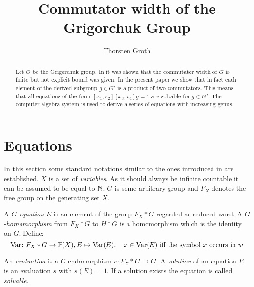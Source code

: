 \documentclass[a4paper,12pt]{article}
\title{Commutator width of the Grigorchuk Group}
\author{Thorsten Groth}
\begin{document}
\maketitle
%

\begin{abstract}
Let $G$ be the Grigorchuk group. In \cite{Lysenok:QudraticEquationsInGrig} it was shown that the commutator width of $G$ is finite but not explicit bound was given.
In the present paper we show that in fact each element of the derived subgroup $g\in G'$ is a product of two commutators. This means that all equations
of the form $[x_1,x_2][x_3,x_4]g=1$ are solvable for $g\in G'$. The computer algebra system \cite{GAP4} is used to derive a series of equations with increasing 
genus. 
\end{abstract}
\tableofcontents
\section{Equations}
In this section some standard notations similar to the ones introduced in\cite{ComerfordEquationsFreeGroups} are established.
$X$ is a set of \emph{variables}. As it should always be infinite countable it can be assumed to be equal to $\mathbb{N}$. $G$ is some
arbitrary group and $F_X$ denotes the free group on the generating set $X$.

A $G$\emph{-equation} $E$ is an element of the group $F_X * G$ regarded as reduced word.
A $G$-\emph{homomorphism} from $F_X * G$ to $H*G$ is a homomorphism which is the identity on $G$.
Define:
\[\textup{Var} \colon F_X * G \to \mathbb{P}(X), E \mapsto \textup{Var}(E), \quad x\in \textup{Var}(E) \textup{ iff the symbol $x$ occurs in $w$}\]

An \emph{evaluation} is a $G$-endomorphism $e\colon F_X * G \to G$.
A \emph{solution} of an equation $E$ is an evaluation $s$ with $s(E)=1$. If a solution exists the equation is called \emph{solvable}.
\end{document}
